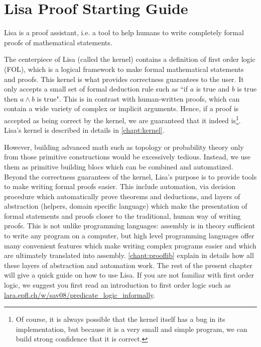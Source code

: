\chapter{Lisa Proof Starting Guide}
\label{chapt:quickguide}
Lisa is a proof assistant, i.e. a tool to help humans to write completely formal proofs of mathematical statements. 

The centerpiece of Lisa (called the kernel) contains a definition of first order logic (FOL), which is a logical framework to make formal mathematical statements and proofs. This kernel is what provides correctness guarantees to the user. It only accepts a small set of formal deduction rule such as ``if $a$ is true and $b$ is true then $a\land b$ is true". 
This is in contrast with human-written proofs, which can contain a wide variety of complex or implicit arguments. Hence, if a proof is accepted as being correct by the kernel, we are guaranteed that it indeed is\footnote{Of course, it is always possible that the kernel itself has a bug in its implementation, but because it is a very small and simple program, we can build strong confidence that it is correct.}.
Lisa's kernel is described in details in \autoref{chapt:kernel}.

However, building advanced math such as topology or probability theory only from those primitive constructions would be excessively tedious. Instead, we use them as primitive building blocs which can be combined and automatized. Beyond the correctness guarantees of the kernel, Lisa's purpose is to provide tools to make writing formal proofs easier. This include automation, via decision procedure which automatically prove theorems and deductions, and layers of abstraction (helpers, domain specific language) which make the presentation of formal statements and proofs closer to the traditional, human way of writing proofs. 
This is not unlike programming languages: assembly is in theory sufficient to write any program on a computer, but high level programming languages offer many convenient features which make writing complex programs easier and which are ultimately translated into assembly. 
\autoref{chapt:prooflib} explain in details how all these layers of abstraction and automation work. The rest of the present chapter will give a quick guide on how to use Lisa. If you are not familiar with first order logic, we suggest you first read an introduction to first order logic such as \url{lara.epfl.ch/w/sav08/predicate_logic_informally}.

